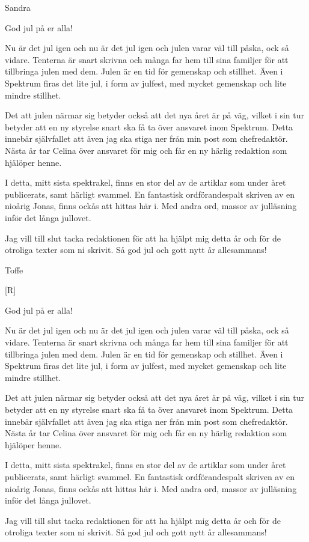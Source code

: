 \documentclass{spektraklet}
\begin{document}
\begin{ledaren}{Sandra}


God jul på er alla!

Nu är det jul igen och nu är det jul igen och julen varar väl till påska, ock så vidare. Tenterna är snart skrivna och många far hem till sina familjer för att tillbringa julen med dem. Julen är en tid för gemenskap och stillhet. Även i Spektrum firas det lite jul, i form av julfest, med mycket gemenskap och lite mindre stillhet.

Det att julen närmar sig betyder också att det nya året är på väg, vilket i sin tur betyder att en ny styrelse snart ska få ta över ansvaret inom Spektrum. Detta innebär självfallet att även jag ska stiga ner från min post som chefredaktör. Nästa år tar Celina över ansvaret för mig och får en ny härlig redaktion som hjälöper henne.

I detta, mitt sista spektrakel, finns en stor del av de artiklar som under året publicerats, samt härligt svammel. En fantastisk ordförandespalt skriven av en nioårig Jonas, finns ockås att hittas här i. Med andra ord, massor av julläsning inför det långa jullovet.

Jag vill till slut tacka redaktionen för att ha hjälpt mig detta år och för de otroliga texter som ni skrivit. Så god jul och gott nytt år allesammans!

\end{ledaren}




\begin{ordforandespalten}{Toffe}

[R]

God jul på er alla!

Nu är det jul igen och nu är det jul igen och julen varar väl till påska, ock så vidare. Tenterna är snart skrivna och många far hem till sina familjer för att tillbringa julen med dem. Julen är en tid för gemenskap och stillhet. Även i Spektrum firas det lite jul, i form av julfest, med mycket gemenskap och lite mindre stillhet.

Det att julen närmar sig betyder också att det nya året är på väg, vilket i sin tur betyder att en ny styrelse snart ska få ta över ansvaret inom Spektrum. Detta innebär självfallet att även jag ska stiga ner från min post som chefredaktör. Nästa år tar Celina över ansvaret för mig och får en ny härlig redaktion som hjälöper henne.

I detta, mitt sista spektrakel, finns en stor del av de artiklar som under året publicerats, samt härligt svammel. En fantastisk ordförandespalt skriven av en nioårig Jonas, finns ockås att hittas här i. Med andra ord, massor av julläsning inför det långa jullovet.

Jag vill till slut tacka redaktionen för att ha hjälpt mig detta år och för de otroliga texter som ni skrivit. Så god jul och gott nytt år allesammans!
	
\end{ordforandespalten}
\end{document}
